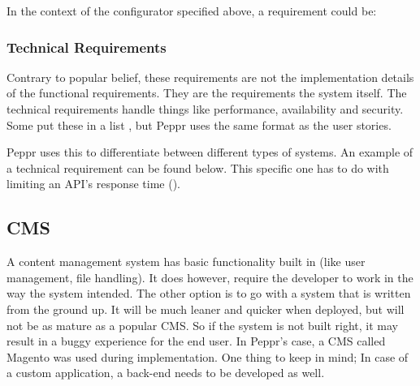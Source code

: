 \newline

In the context of the configurator specified above, a requirement could be: \newline

\newline

\subsubsection{Technical Requirements}
Contrary to popular belief, these requirements are not the implementation details of the functional requirements. They are the requirements the system itself. The technical requirements handle things like performance, availability and security. Some put these in a list \cite{Agile: Technical Requirements}, but Peppr uses the same format as the user stories. \newline

\newline

Peppr uses this to differentiate between different types of systems. An example of a technical requirement can be found below. This specific one has to do with limiting an API's response time (\cite{Response Times}).

\newline

\subsection{CMS}
A content management system has basic functionality built in (like user management, file handling). It does however, require  the developer to work in the way the system intended. The other option is to go with a system that is written from the ground up. It will be much leaner and quicker when deployed, but will not be as mature as a popular CMS. So if the system is not built right, it may result in a buggy experience for the end user. In Peppr's case, a CMS called Magento was used during implementation. One thing to keep in mind; In case of a custom application, a back-end needs to be developed as well.

